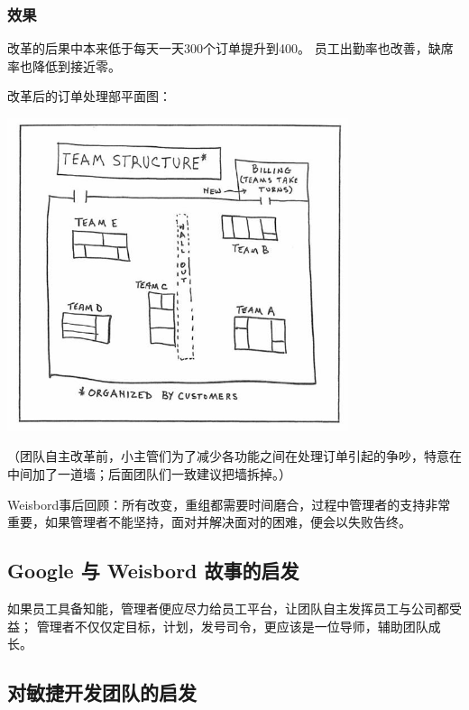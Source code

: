 \hypertarget{ux6548ux679c}{%
\subsubsection{效果}\label{ux6548ux679c}}

改革的后果中本来低于每天一天300个订单提升到400。
员工出勤率也改善，缺席率也降低到接近零。

改革后的订单处理部平面图： 

\includegraphics[width=10cm]{0A_Agile_stories_p5.jpg}

（团队自主改革前，小主管们为了减少各功能之间在处理订单引起的争吵，特意在中间加了一道墙；后面团队们一致建议把墙拆掉。）

Weisbord事后回顾：所有改变，重组都需要时间磨合，过程中管理者的支持非常重要，如果管理者不能坚持，面对并解决面对的困难，便会以失败告终。

\hypertarget{google-ux4e0e-weisbord-ux6545ux4e8bux7684ux542fux53d1}{%
\subsection{Google 与 Weisbord
故事的启发}\label{google-ux4e0e-weisbord-ux6545ux4e8bux7684ux542fux53d1}}

如果员工具备知能，管理者便应尽力给员工平台，让团队自主发挥员工与公司都受益；
管理者不仅仅定目标，计划，发号司令，更应该是一位导师，辅助团队成长。

\hypertarget{ux5bf9ux654fux6377ux5f00ux53d1ux56e2ux961fux7684ux542fux53d1}{%
\subsection{对敏捷开发团队的启发}\label{ux5bf9ux654fux6377ux5f00ux53d1ux56e2ux961fux7684ux542fux53d1}}

